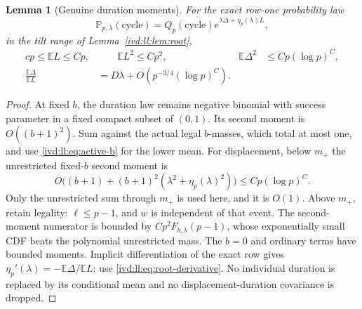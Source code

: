 \documentclass[11pt,letterpaper]{article}
\newtheorem{lemma}[theorem]{Lemma}
\theoremstyle{remark}\newtheorem{remark}[theorem]{Remark}
\numberwithin{equation}{section}
\newcommand{\Prob}{\mathbb P}\newcommand{\E}{\mathbb E}
\begin{document}
\begin{lemma}[Genuine duration moments]\label{ivd:ll:lem:moments}
For the exact row-one probability law
\begin{equation}\label{ivd:ll:eq:law}
 \Prob_{p,\lambda}(\text{cycle})
       =Q_p(\text{cycle})e^{\lambda\Delta+\eta_p(\lambda)L},
\end{equation}
in the tilt range of Lemma~\ref{ivd:ll:lem:root},
\begin{align}
 cp\le\E L\le Cp,&\qquad \E L^2\le Cp^2,
       &\E\Delta^2&\le Cp(\log p)^C,\label{ivd:ll:eq:moments}\\
 \frac{\E\Delta}{\E L}&=D\lambda+O(p^{-3/4}(\log p)^C).
 \label{ivd:ll:eq:drift}
\end{align}
\end{lemma}
\begin{proof}
At fixed $b$, the duration law remains negative binomial with success
parameter in a fixed compact subset of $(0,1)$. Its second moment
is $O((b+1)^2)$. Sum against the actual legal $b$-masses, which total
at most one, and use \eqref{ivd:ll:eq:active-b} for the lower mean.
For displacement, below $m_+$ the unrestricted fixed-$b$ second
moment is
\[
 O\big((b+1)+(b+1)^2(\lambda^2+\eta_p(\lambda)^2)\big)
 \le Cp(\log p)^C.
\]
Only the unrestricted sum through $m_+$ is used here, and it is
$O(1)$. Above $m_+$, retain legality: $\ell\le p-1$, and $w$ is
independent of that event. The second-moment numerator is bounded
by $Cp^2F_{b,\lambda}(p-1)$, whose exponentially small CDF beats
the polynomial unrestricted mass. The $b=0$ and ordinary terms
have bounded moments. Implicit differentiation of the exact row gives
$\eta_p'(\lambda)=-\E\Delta/\E L$; use
\eqref{ivd:ll:eq:root-derivative}. No individual duration is replaced by
its conditional mean and no displacement-duration covariance is dropped.
\end{proof}
\end{document}

